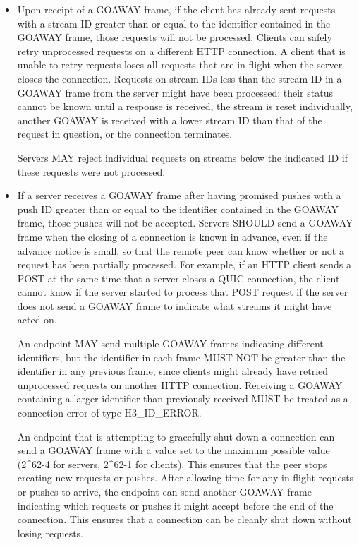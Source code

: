 \documentclass{article}
\begin{document}
\begin{itemize}
\item Upon receipt of a GOAWAY frame, if the client has already sent requests with a stream ID greater than or equal to the identifier contained in the GOAWAY frame, those requests will not be processed.  Clients can safely retry unprocessed requests on a different HTTP connection.  A client that is unable to retry requests loses all requests that are in flight when the server closes the connection.
Requests on stream IDs less than the stream ID in a GOAWAY frame from the server might have been processed; their status cannot be known until a response is received, the stream is reset individually, another GOAWAY is received with a lower stream ID than that of the request in question, or the connection terminates.

Servers MAY reject individual requests on streams below the indicated ID if these requests were not processed.

\item If a server receives a GOAWAY frame after having promised pushes with a push ID greater than or equal to the identifier contained in the GOAWAY frame, those pushes will not be accepted.
Servers SHOULD send a GOAWAY frame when the closing of a connection is known in advance, even if the advance notice is small, so that the remote peer can know whether or not a request has been partially processed.  For example, if an HTTP client sends a POST at the same time that a server closes a QUIC connection, the client cannot know if the server started to process that POST request if the server does not send a GOAWAY frame to indicate what streams it might have acted on.

An endpoint MAY send multiple GOAWAY frames indicating different identifiers, but the identifier in each frame MUST NOT be greater than the identifier in any previous frame, since clients might already have retried unprocessed requests on another HTTP connection. Receiving a GOAWAY containing a larger identifier than previously received MUST be treated as a connection error of type H3\_ID\_ERROR.

An endpoint that is attempting to gracefully shut down a connection can send a GOAWAY frame with a value set to the maximum possible value (2\textasciicircum{}62-4 for servers, 2\textasciicircum{}62-1 for clients).  This ensures that the peer stops creating new requests or pushes.  After allowing time for any in-flight requests or pushes to arrive, the endpoint can send another GOAWAY frame indicating which requests or pushes it might accept before the end of the connection.  This ensures that a connection can be cleanly shut down without losing requests.


\end{itemize}
\end{document}
